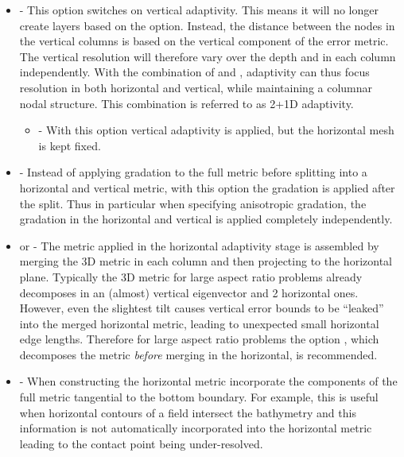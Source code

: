 \begin{itemize}
\item {} -
This option switches on vertical adaptivity. This means it will no longer create
layers based on the  option. Instead, the distance
between the nodes in the vertical columns is based on the vertical component of
the error metric. The vertical resolution will therefore vary over the depth and
in each column independently. With the combination of
 and
, adaptivity can thus focus resolution
in both horizontal and vertical, while maintaining a columnar nodal structure.
This combination is referred to as 2+1D adaptivity.
\begin{itemize}
\item {} - With this option vertical adaptivity is
applied, but the horizontal mesh is kept fixed.
\end{itemize}
\item {} - Instead of applying gradation to the full metric
before splitting into a horizontal and vertical metric, with this option the
gradation is applied after the split. Thus in particular when specifying
anisotropic gradation, the gradation in the horizontal and vertical is applied
completely independently.
\item {} or  -
The metric applied in the horizontal adaptivity stage is assembled by merging
the 3D metric in each column and then projecting to the horizontal plane.
Typically the 3D metric for large aspect ratio problems already decomposes
in an (almost) vertical eigenvector and 2 horizontal ones.
However, even the slightest tilt causes vertical error bounds
to be ``leaked'' into the merged horizontal metric, leading to unexpected small
horizontal edge lengths. Therefore for large aspect ratio problems the option
, which decomposes the metric \emph{before}
merging in the horizontal, is recommended.
\item {} - When constructing the horizontal metric
incorporate the components of the full metric tangential to the bottom boundary.
For example, this is useful when horizontal contours of a field intersect the
bathymetry and this information is not automatically incorporated into the
horizontal metric leading to the contact point being under-resolved.
\end{itemize}

